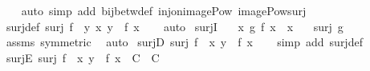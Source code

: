 \begin{isabellebody}
%
\isadelimproof
\ \ %
\endisadelimproof
%
\isatagproof
{}\isamarkupfalse%
\ {\isacharparenleft}{\kern0pt}auto\ simp\ add{\isacharcolon}{\kern0pt}\ bij{\isacharunderscore}{\kern0pt}betw{\isacharunderscore}{\kern0pt}def\ inj{\isacharunderscore}{\kern0pt}on{\isacharunderscore}{\kern0pt}image{\isacharunderscore}{\kern0pt}Pow\ image{\isacharunderscore}{\kern0pt}Pow{\isacharunderscore}{\kern0pt}surj{\isacharparenright}{\kern0pt}%
\endisatagproof
{\isafoldproof}%
%
\isadelimproof
\isanewline
%
\endisadelimproof
\isanewline
{}\isamarkupfalse%
\ surj{\isacharunderscore}{\kern0pt}def{\isacharcolon}{\kern0pt}\ {\isachardoublequoteopen}surj\ f\ {\isasymlongleftrightarrow}\ {\isacharparenleft}{\kern0pt}{\isasymforall}y{\isachardot}{\kern0pt}\ {\isasymexists}x{\isachardot}{\kern0pt}\ y\ {\isacharequal}{\kern0pt}\ f\ x{\isacharparenright}{\kern0pt}{\isachardoublequoteclose}\isanewline
%
\isadelimproof
\ \ %
\endisadelimproof
%
\isatagproof
{}\isamarkupfalse%
\ auto%
\endisatagproof
{\isafoldproof}%
%
\isadelimproof
\isanewline
%
\endisadelimproof
\isanewline
{}\isamarkupfalse%
\ surjI{\isacharcolon}{\kern0pt}\isanewline
\ \ \ {\isachardoublequoteopen}{\isasymAnd}x{\isachardot}{\kern0pt}\ g\ {\isacharparenleft}{\kern0pt}f\ x{\isacharparenright}{\kern0pt}\ {\isacharequal}{\kern0pt}\ x{\isachardoublequoteclose}\isanewline
\ \ \ {\isachardoublequoteopen}surj\ g{\isachardoublequoteclose}\isanewline
%
\isadelimproof
\ \ %
\endisadelimproof
%
\isatagproof
{}\isamarkupfalse%
\ assms\ {\isacharbrackleft}{\kern0pt}symmetric{\isacharbrackright}{\kern0pt}\ \isamarkupfalse%
\ auto%
\endisatagproof
{\isafoldproof}%
%
\isadelimproof
\isanewline
%
\endisadelimproof
\isanewline
{}\isamarkupfalse%
\ surjD{\isacharcolon}{\kern0pt}\ {\isachardoublequoteopen}surj\ f\ {\isasymLongrightarrow}\ {\isasymexists}x{\isachardot}{\kern0pt}\ y\ {\isacharequal}{\kern0pt}\ f\ x{\isachardoublequoteclose}\isanewline
%
\isadelimproof
\ \ %
\endisadelimproof
%
\isatagproof
{}\isamarkupfalse%
\ {\isacharparenleft}{\kern0pt}simp\ add{\isacharcolon}{\kern0pt}\ surj{\isacharunderscore}{\kern0pt}def{\isacharparenright}{\kern0pt}%
\endisatagproof
{\isafoldproof}%
%
\isadelimproof
\isanewline
%
\endisadelimproof
\isanewline
{}\isamarkupfalse%
\ surjE{\isacharcolon}{\kern0pt}\ {\isachardoublequoteopen}surj\ f\ {\isasymLongrightarrow}\ {\isacharparenleft}{\kern0pt}{\isasymAnd}x{\isachardot}{\kern0pt}\ y\ {\isacharequal}{\kern0pt}\ f\ x\ {\isasymLongrightarrow}\ C{\isacharparenright}{\kern0pt}\ {\isasymLongrightarrow}\ C{\isachardoublequoteclose}\isanewline

\end{isabellebody}
